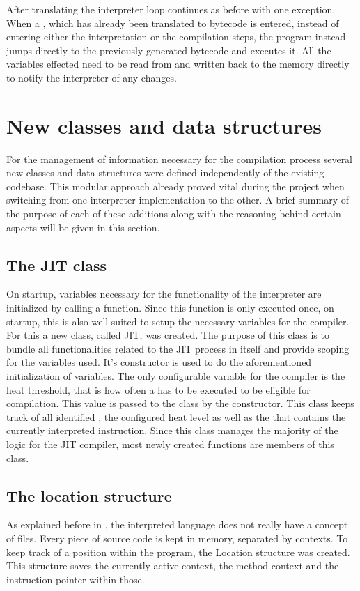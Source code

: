After translating the interpreter loop continues as before with one exception. When a \bb{}, which has already been translated to bytecode is entered, instead of entering either the interpretation or the compilation steps, the program instead jumps directly to the previously generated bytecode and executes it. All the variables effected need to be read from and written back to the memory directly to notify the interpreter of any changes.

\section{New classes and data structures}
For the management of information necessary for the compilation process several new classes and data structures were defined independently of the existing codebase. This modular approach already proved vital during the project when switching from one interpreter implementation to the other. A brief summary of the purpose of each of these additions along with the reasoning behind certain aspects will be given in this section.

\subsection{The JIT class}
On startup, variables necessary for the functionality of the interpreter are initialized by calling a function. Since this function is only executed once, on startup, this is also well suited to setup the necessary variables for the \jit{} compiler. 
For this a new class, called JIT, was created. The purpose of this class is to bundle all functionalities related to the JIT process in itself and provide scoping for the variables used. It's constructor is used to do the aforementioned initialization of variables. The only configurable variable for the \jit{} compiler is the heat threshold, that is how often a \bb{} has to be executed to be eligible for compilation. This value is passed to the class by the constructor.
This class keeps track of all identified \bbs{}, the configured heat level as well as the \bb{} that contains the currently interpreted instruction.
Since this class manages the majority of the logic for the JIT compiler, most newly created functions are members of this class. 

\subsection{The location structure}
As explained before in , the interpreted language does not really have a concept of files. Every piece of source code is kept in memory, separated by contexts. 
To keep track of a position within the program, the Location structure was created. This structure saves the currently active context, the method context and the instruction pointer within those.

